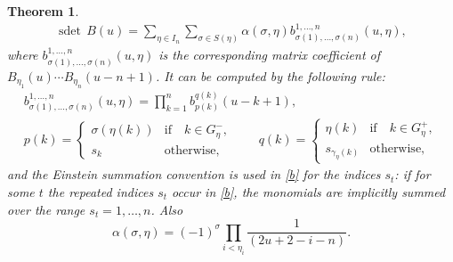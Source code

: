 \documentclass[11pt]{article}
\newtheorem{theorem}{Theorem}
\begin{document}
  \begin{theorem}\label{sdet}
\begin{gather*}%
\operatorname{sdet}\, B(u)=
\sum_{ \eta\in I_n } \sum_{\sigma\in S(\eta)}  \alpha(\sigma, \eta)
b^{1,\dots , n}_{\sigma(1),\dots, \sigma(n)}(u,\eta),
\end{gather*}
where $b^{1,\dots ,n}_{\sigma(1),\dots , \sigma(n)}(u,\eta)$ is the corresponding matrix coefficient of   $B_{\eta_1}(u) \cdots B_{\eta_n}(u-n+1)$. It can be computed by the following rule:
 \begin{gather}\label{b}
b^{1,\dots ,n}_{\sigma(1),\dots, \sigma(n)}(u,\eta)=
   \prod_{k=1}^{n}
b_{p(k)}^{q(k)}(u-k+1),\\
 p{(k)}=
\begin{cases}
\sigma(\eta(k))  &  \text{if}\quad k\in G_\eta^ -,\\
s_k& \text{otherwise},
\end{cases}
\qquad
q{(k)}=
\begin{cases}
\eta(k)  &\text{if}\quad
k\in G_\eta^+ ,\\
s_{\gamma_\eta(k)}&\text{otherwise},
\end{cases}\nonumber
\end{gather}
 and  the Einstein summation convention is used in \eqref{b} for the indices $s_t$: if  for some $t$ the repeated indices $s_t$ occur in \eqref{b}, the monomials are implicitly summed over  the range $s_t=1,\dots, n$.
Also
\[
\alpha(\sigma, \eta)=(-1)^{\sigma}
\prod_{i<\eta_i} \frac{1}{(2u+2-i-n)}.
\]
\end{theorem}
\end{document}
